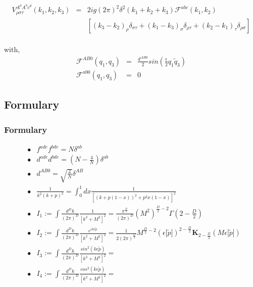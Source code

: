 \documentclass[a4paper,11pt]{article} %
\theoremstyle{plain}
\theoremstyle{definition}
\theoremstyle{remark}
\numberwithin{equation}{section}
\numberwithin{equation}{subsection}
\numberwithin{figure}{section}
\begin{document}

\begin{eqnarray*}
 V_{\rho  \sigma  \tau}^{A^{a} A^{b} c^{d} } (k_1 , k_2 , k_3 ) &=& 2ig (2 \pi)^2 \delta^{2} ( k_1 + k_2 + k_3 )  \mathcal{F}^{abc}(k_1 , k_2) 
 \nonumber \\
&&   \left[
(k_3  -  k_2)_{\rho}  \delta_{\sigma  \tau}  +  (k_1  -  k_3)_{\sigma}  \delta_{\rho  \tau}  +  (k_2  -  k_1)_{\tau}  \delta_{\rho  \sigma }
\right]    
\end{eqnarray*}  \\

\noindent
with,
\begin{eqnarray*}
 \mathcal{F}^{AB0}(q_1 , q_3)  &=&  \frac{d^{AB0}}{2}   sin \left(  \frac{\epsilon}{2}  q_1  \tilde{q}_3  \right)  \\
% 
 \mathcal{F}^{a00}(q_1 , q_3)  &=& 0
\end{eqnarray*}



  \subsection{Formulary}

    \subsubsection{Formulary}

\begin{eqnarray*}
 &\bullet&  f^{ade} f^{bde}  =  N  \delta^{ab}  \\
 &\bullet&  d^{ade} d^{bde}  =  \left( N - \frac{4}{N} \right)  \delta^{ab}  \\
 &\bullet&  d^{AB0} = \sqrt{\frac{2}{N}}  \delta^{AB}  \\
 &\bullet& \frac{1}{k^2 (k+p)^2 }  =  \int_{0}^{1}   dx  \frac{1}{ \left[ (k+p(1-x))^2  +  p^2 x(1-x) \right]^2  }  \\
 &\bullet& I_{1} := \int  \frac{d^D k}{(2 \pi)^D}   \frac{1}{\left[ k^2 + M^2 \right]^2 }  =  
 \frac{ \pi^{\frac{D}{2}} }{ (2 \pi)^{D}  }  (M^2)^{\frac{D}{2}-2} \Gamma(2-\frac{D}{2}) \\
 &\bullet& I_{2} := \int  \frac{d^D k}{(2 \pi)^D}   \frac{e^{ik \epsilon \tilde{p}}}{\left[ k^2 + M^2 \right]^2 }  = 
 \frac{1}{2 (2 \pi )^{ \frac{D}{2}}}  M^{\frac{D}{2} - 2}  \left( \epsilon \left| \tilde{p}  \right|  \right)^{ 2-\frac{D}{2} } 
 \textbf{K}_{2- \frac{D}{2}  } ( M  \epsilon \left| \tilde{p}  \right|  )  \\
 &\bullet& I_{3} := \int  \frac{d^D k}{(2 \pi)^D}   \frac{sin^{2}(k \epsilon \tilde{p})}{\left[ k^2 + M^2 \right]^2 }  = \\
 &\bullet& I_{4} := \int  \frac{d^D k}{(2 \pi)^D}   \frac{cos^{2}(k \epsilon \tilde{p})}{\left[ k^2 + M^2 \right]^2 }  =  
\end{eqnarray*}
\end{document}
